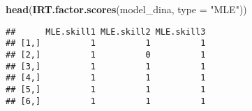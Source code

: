\documentclass[]{article}
\newenvironment{Shaded}{\begin{snugshade}}{\end{snugshade}}
\newcommand{\DataTypeTok}[1]{\textcolor[rgb]{0.13,0.29,0.53}{#1}}
\newcommand{\KeywordTok}[1]{\textcolor[rgb]{0.13,0.29,0.53}{\textbf{#1}}}
\newcommand{\NormalTok}[1]{#1}
\newcommand{\StringTok}[1]{\textcolor[rgb]{0.31,0.60,0.02}{#1}}
\begin{document}
\begin{Shaded}
\begin{Highlighting}[]
\KeywordTok{head}\NormalTok{(}\KeywordTok{IRT.factor.scores}\NormalTok{(model_dina, }\DataTypeTok{type =} \StringTok{"MLE"}\NormalTok{))}
\end{Highlighting}
\end{Shaded}

\begin{verbatim}
##      MLE.skill1 MLE.skill2 MLE.skill3
## [1,]          1          1          1
## [2,]          1          0          1
## [3,]          1          1          1
## [4,]          1          1          1
## [5,]          1          1          1
## [6,]          1          1          1
\end{verbatim}
\end{document}
